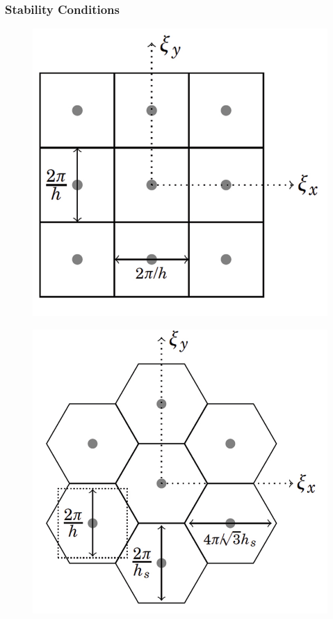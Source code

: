 \documentclass{beamer}
\begin{document}
\begin{frame}
\frametitle{Stability Conditions}
\begin{figure}
\centering
\begin{minipage}{.5\textwidth}
  \centering
\includegraphics[scale=0.1]{./images/jpgDualRect.jpg}
\label{fig:DualRectGrid}
\end{minipage}%
\begin{minipage}{.5\textwidth}
  \centering
\includegraphics[scale=0.1]{./images/jpgDualHex.jpg}
\label{fig:DualHexGrid}
\end{minipage}
\end{figure}


\end{frame}
\end{document}
